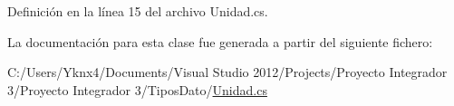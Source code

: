 Definición en la línea 15 del archivo Unidad.\-cs.



La documentación para esta clase fue generada a partir del siguiente fichero\-:\begin{DoxyCompactItemize}
\item 
C\-:/\-Users/\-Yknx4/\-Documents/\-Visual Studio 2012/\-Projects/\-Proyecto Integrador 3/\-Proyecto Integrador 3/\-Tipos\-Dato/\hyperlink{_unidad_8cs}{Unidad.\-cs}\end{DoxyCompactItemize}
